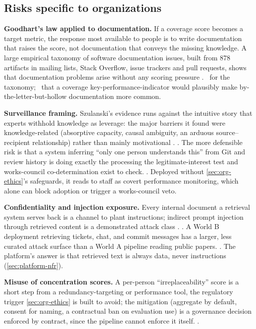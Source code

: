 \subsection{Risks specific to organizations}
\label{sec:org-risks}

\textbf{Goodhart's law applied to documentation.} If a coverage score becomes a target metric, the
response most available to people is to write documentation that raises the score, not
documentation that conveys the missing knowledge. A large empirical taxonomy of software documentation
issues, built from 878 artifacts in mailing lists, Stack Overflow, issue trackers and pull requests,
shows that documentation problems arise without any scoring pressure
\parencite{aghajani2019software}. \evlit\ for the taxonomy; \evint\ that a coverage
key-performance-indicator would plausibly make by-the-letter-but-hollow documentation more common.

\textbf{Surveillance framing.} Szulanski's evidence runs against the intuitive story that experts
withhold knowledge as leverage: the major barriers it found were knowledge-related (absorptive
capacity, causal ambiguity, an arduous source--recipient relationship) rather than mainly motivational
\parencite{szulanski1996exploring}. \evlit. The more defensible risk is that a
system inferring ``only one person understands this'' from Git and review history is doing exactly
the processing the legitimate-interest test and works-council co-determination exist to check.
\evint. Deployed without \cref{sec:org-ethics}'s safeguards, it reads to staff as covert
performance monitoring, which alone can block adoption or trigger a works-council veto.

\textbf{Confidentiality and injection exposure.} Every internal document a retrieval system serves
back is a channel to plant instructions; indirect prompt injection through retrieved content is a
demonstrated attack class \parencite{greshake2023not}. \evlit. A World B deployment retrieving
tickets, chat, and commit messages has a larger, less curated attack surface than a World A pipeline
reading public papers. \evint. The platform's answer is that retrieved text is always data, never
instructions (\cref{sec:platform-nfr}).

\textbf{Misuse of concentration scores.} A per-person ``irreplaceability'' score is a short step
from a redundancy-targeting or performance tool, the regulatory trigger \cref{sec:org-ethics} is
built to avoid; the mitigation (aggregate by default, consent for naming, a contractual ban on
evaluation use) is a governance decision enforced by contract, since the pipeline cannot enforce it
itself. \evint.
